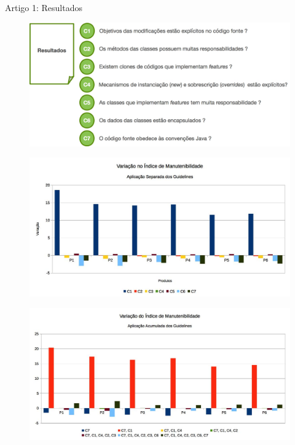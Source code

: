 
\begin{frame}{Artigo 1: Resultados}
   \begin{figure}[hbt]
    \includegraphics[scale=0.35]{imagens/artigo1-resultados-1.jpg}
  \end{figure}  
   \begin{figure}[hbt]
    \includegraphics[scale=0.40]{imagens/artigo1-resultados-2.jpg}
  \end{figure} 
  \begin{figure}[hbt]
    \includegraphics[scale=0.36]{imagens/artigo1-resultados-3.jpg}
  \end{figure} 
\end{frame}